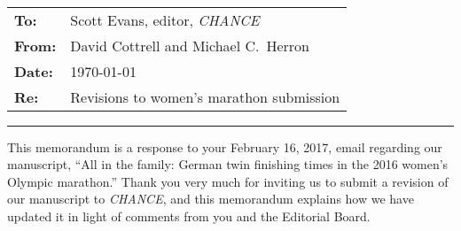 \documentclass[12pt]{article}
\begin{document}
\thispagestyle{empty}


\\[0.5in]

\noindent
\begin{tabular}{ll}
  \textbf{To:} &  Scott Evans, editor, \emph{CHANCE}\\
  \textbf{From:} & David Cottrell and Michael C.\ Herron\\
  \textbf{Date:} & \today \\
  \textbf{Re:} &  Revisions to women's marathon submission
\end{tabular}

\vspace{.1in}
\hrule
\vspace{.2in}

\bigskip

This memorandum is a response to your February 16, 2017, email
regarding our manuscript, ``All in the family: German twin finishing
times in the 2016 women's Olympic marathon.'' Thank you very much for
inviting us to submit a revision of our manuscript to \emph{CHANCE},
and this memorandum explains how we have updated it in light of
comments from you and the Editorial Board.
\end{document}
